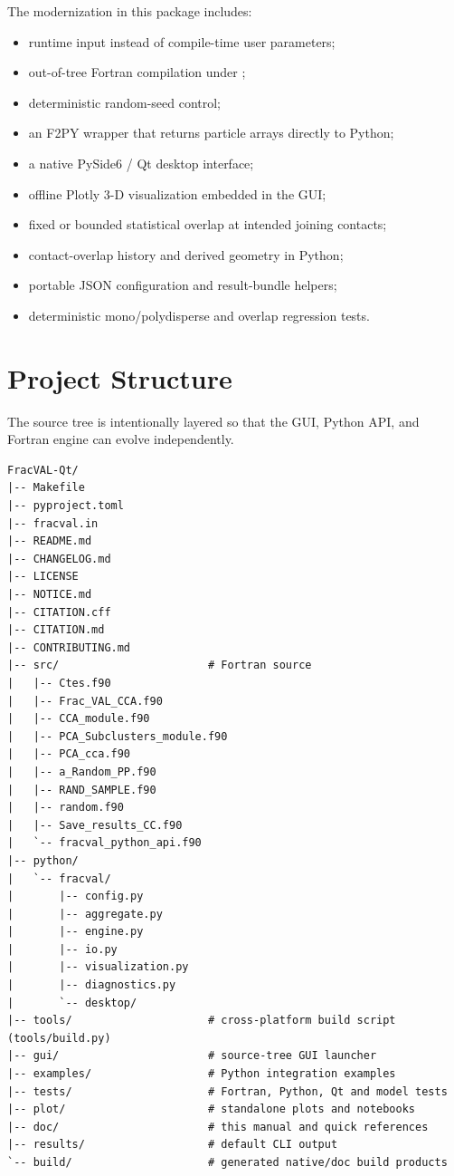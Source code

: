 \documentclass[11pt,oneside]{report}
\begin{document}
The modernization in this package includes:
\begin{itemize}[leftmargin=1.6em]
  \item runtime input instead of compile-time user parameters;
  \item out-of-tree Fortran compilation under ;
  \item deterministic random-seed control;
  \item an F2PY wrapper that returns particle arrays directly to Python;
  \item a native PySide6 / Qt desktop interface;
  \item offline Plotly 3-D visualization embedded in the GUI;
  \item fixed or bounded statistical overlap at intended joining contacts;
  \item contact-overlap history and derived geometry in Python;
  \item portable JSON configuration and result-bundle helpers;
  \item deterministic mono/polydisperse and overlap regression tests.
\end{itemize}

\chapter{Project Structure}

The source tree is intentionally layered so that the GUI, Python API, and
Fortran engine can evolve independently.

\begin{lstlisting}
FracVAL-Qt/
|-- Makefile
|-- pyproject.toml
|-- fracval.in
|-- README.md
|-- CHANGELOG.md
|-- LICENSE
|-- NOTICE.md
|-- CITATION.cff
|-- CITATION.md
|-- CONTRIBUTING.md
|-- src/                       # Fortran source
|   |-- Ctes.f90
|   |-- Frac_VAL_CCA.f90
|   |-- CCA_module.f90
|   |-- PCA_Subclusters_module.f90
|   |-- PCA_cca.f90
|   |-- a_Random_PP.f90
|   |-- RAND_SAMPLE.f90
|   |-- random.f90
|   |-- Save_results_CC.f90
|   `-- fracval_python_api.f90
|-- python/
|   `-- fracval/
|       |-- config.py
|       |-- aggregate.py
|       |-- engine.py
|       |-- io.py
|       |-- visualization.py
|       |-- diagnostics.py
|       `-- desktop/
|-- tools/                     # cross-platform build script (tools/build.py)
|-- gui/                       # source-tree GUI launcher
|-- examples/                  # Python integration examples
|-- tests/                     # Fortran, Python, Qt and model tests
|-- plot/                      # standalone plots and notebooks
|-- doc/                       # this manual and quick references
|-- results/                   # default CLI output
`-- build/                     # generated native/doc build products
\end{lstlisting}
\end{document}
